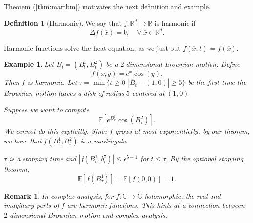 \documentclass{tufte-handout}
\newcommand*\R{\mathbb{R}}
\newcommand*\E{\mathbb{E}}
\newtheorem{rmk}[thm]{Remark}
\newtheorem{ex}[thm]{Example}
\theoremstyle{definition}
\newtheorem{defn}[thm]{Definition}
\begin{document}
Theorem (\ref{thm:martbm}) motivates the next definition and example.

\begin{defn}[Harmonic]
	We say that $f: \R^d \to \R$ is harmonic if \[
		\Delta f(\overline{x}) = 0, \quad \forall\ \overline{x} \in \R^d
	.\] 
\end{defn}

Harmonic functions solve the heat equation, as we just put $f(\overline{x},t) \coloneqq f(\overline{x})$.

\begin{ex}
	Let $\overline{B}_t = \left( B_t^1, B_t^2 \right)$ be a $2$-dimensional Brownian motion. Define \[
		f(x,y) = e^{x} \cos{\left(y\right)}
	.\] Then $f$ is harmonic. 
	Let $\tau = \min \{t\ge 0 : \left| \overline{B}_t - (1,0) \right| \ge 5\}$ be the first time the Brownian motion leaves a disk of radius $5$ centered at $(1,0)$.

	Suppose we want to compute \[
		\E\left[e^{B_\tau^1} \cos{\left(B_\tau^2\right)}\right] 
	.\] We cannot do this explicitly. Since $f$ grows at most exponentially, by our theorem, we have that $f(B_t^1, B_t^2)$ is a martingale. 

	$\tau$ is a stopping time and $\left| f(B_t^1,b_t^2) \right| \le e^{5+1}$ for $t \le \tau$. By the optional stopping theorem, \[
		\E\left[f(B_\tau^1)\right] = \E\left[f(0,0)\right] = 1
	.\] 

\end{ex}

\begin{rmk}
	In complex analysis, for $f: \mathbb{C}\to \mathbb{C}$ holomorphic, the real and imaginary parts of $f$ are harmonic functions. This hints at a connection between $2$-dimensional Brownian motion and complex analysis.
\end{rmk}
\end{document}
